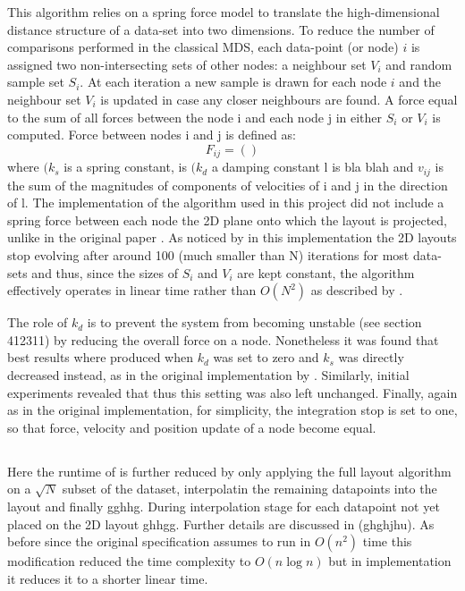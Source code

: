 \documentclass{l4proj}
\begin{document}
This algorithm relies on a spring force model to translate the high-dimensional distance structure of a data-set into two dimensions. To reduce the number of comparisons performed in the classical MDS, each data-point (or node) $i$ is assigned two non-intersecting sets of other nodes: a neighbour set $V_i$ and random sample set $S_i$. At each iteration a new sample is drawn for each node $i$ and the neighbour set $V_i$ is updated in case any closer neighbours are found. A force equal to the sum of all forces between the node i and each node j in either $S_i$ or $V_i$ is computed. Force between nodes i and j is defined as:
\begin{equation}
        F_{ij} = ()
\end{equation}  
where $(k_{s}$ is a spring constant, is $(k_{d}$ a damping constant l is bla blah and $v_{ij}$ is the sum of the magnitudes of components of velocities of i and j in the direction of l. The implementation of the algorithm used in this project \citep{2019} did not include a spring force between each node the 2D plane onto which the layout is projected, unlike in the original paper \citep{Chalmers96}. As noticed by \citet{2019} in this implementation the 2D layouts stop evolving after around 100 (much smaller than N) iterations for most data-sets and thus, since the sizes of $S_i$ and $V_i$ are kept constant, the algorithm effectively operates in linear time rather than $O(N^2)$ as described by \citet{Chalmers96}. 

The role of $k_{d}$ is to prevent the system from becoming unstable (see section 412311) by reducing the overall force on a node. Nonetheless it was found that best results where produced when $k_{d}$ was set to zero and $k_{s}$ was directly decreased instead, as in the original implementation by \citet{2019}. Similarly, initial experiments revealed that  thus this setting was also left unchanged. Finally,  again as in the original implementation, for simplicity, the integration stop is set to one, so that force, velocity and position update of a node become equal. 

\subsection{\cite{hyrid}}

Here the runtime of \citet{Chalmers96} is further reduced by only applying the full layout algorithm on a $\sqrt{N}$ subset of the dataset, interpolatin the remaining datapoints into the layout and finally gghhg. During interpolation stage for each datapoint not yet placed on the 2D layout ghhgg. Further details are discussed in (ghghjhu). As before since the original specification assumes \citet{Chalmers96} to run in $O(n^2)$ time this modification reduced the time complexity to $O(n\log n)$ but in \citet{2019} implementation it reduces it to a shorter linear time.
\end{document}
